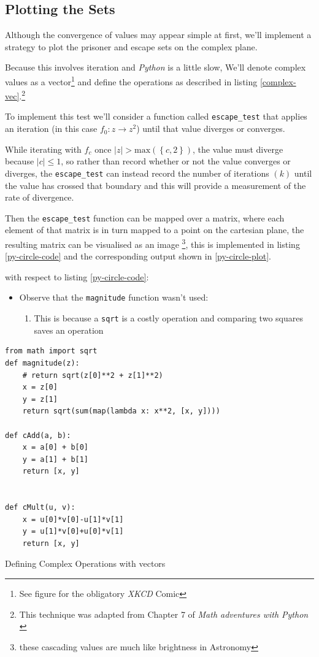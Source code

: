 \documentclass[a4paper,11pt,twoside]{article}
\begin{document}
\subsection{Plotting the Sets}
\label{sec:orga433035}
Although the convergence of values may appear simple at first, we'll implement a
strategy to plot the prisoner and escape sets on the complex plane.

Because this involves iteration and \emph{Python} is a little slow, We'll denote
complex values as a vector\footnote{See figure for the obligatory \emph{XKCD} Comic} and define the operations as described in
listing \ref{complex-vec}.\footnote{This technique was adapted from Chapter 7 of \emph{Math adventures with Python} \cite{farrellMathAdventuresPython2019}}

To implement this test we'll consider a function called \texttt{escape\_test} that applies an
iteration (in this case \(f_{0}: z \rightarrow z^{2}\)) until that value diverges or converges.

While iterating with \(f_{c}\) once \(\left\lvert z \right\rvert >
\mathrm{max}\left(\left\{c, 2\right\}\right)\), the value must diverge because
\(\left\lvert c \right\rvert \leq 1\), so rather than record whether or not the
value converges or diverges, the \texttt{escape\_test} can instead record the number of
iterations \((k)\) until the value has crossed that boundary and this will provide
a measurement of the rate of divergence.

Then the \texttt{escape\_test} function can be mapped over a matrix, where each element
of that matrix is in turn mapped to a point on the cartesian plane, the resulting matrix
can be visualised as an image \footnote{these cascading values are much like brightness in Astronomy}, this is implemented in listing
\ref{py-circle-code} and the corresponding output shown in \ref{py-circle-plot}.

with respect to listing \ref{py-circle-code}:

\begin{itemize}
\item Observe that the \texttt{magnitude} function wasn't used:
\begin{enumerate}
\item This is because a \texttt{sqrt} is a costly operation and comparing two squares saves an operation
\end{enumerate}
\end{itemize}



\begin{listing}[htbp]
\begin{verbatim}
from math import sqrt
def magnitude(z):
    # return sqrt(z[0]**2 + z[1]**2)
    x = z[0]
    y = z[1]
    return sqrt(sum(map(lambda x: x**2, [x, y])))

def cAdd(a, b):
    x = a[0] + b[0]
    y = a[1] + b[1]
    return [x, y]


def cMult(u, v):
    x = u[0]*v[0]-u[1]*v[1]
    y = u[1]*v[0]+u[0]*v[1]
    return [x, y]
\end{verbatim}
\caption{\label{complex-vec}Defining Complex Operations with vectors}
\end{listing}
\end{document}
